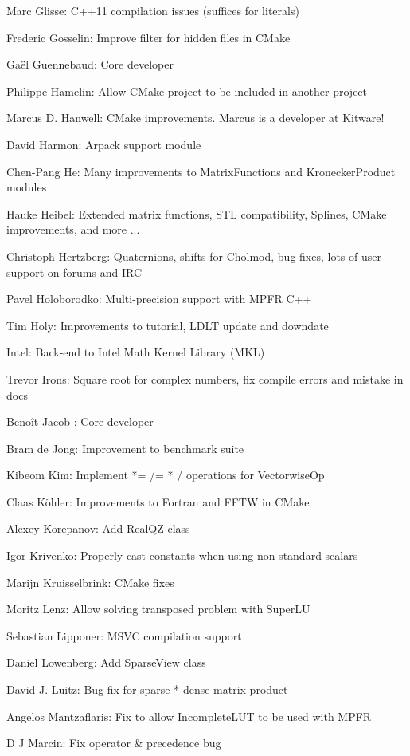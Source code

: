 Marc Glisse:  C++11 compilation issues (suffices for literals)  

Frederic Gosselin:  Improve filter for hidden files in CMake  

Gaël Guennebaud:  Core developer  

Philippe Hamelin:  Allow CMake project to be included in another project  

Marcus D. Hanwell:  CMake improvements. Marcus is a developer at Kitware!  

David Harmon:  Arpack support module  

Chen-Pang He:  Many improvements to MatrixFunctions and KroneckerProduct modules  

Hauke Heibel:  Extended matrix functions, STL compatibility, Splines, CMake improvements, and more ...  

Christoph Hertzberg:  Quaternions, shifts for Cholmod, bug fixes, lots of user support on forums and IRC  

Pavel Holoborodko:  Multi-precision support with MPFR C++  

Tim Holy:  Improvements to tutorial, LDLT update and downdate  

Intel:  Back-end to Intel Math Kernel Library (MKL)  

Trevor Irons:  Square root for complex numbers, fix compile errors and mistake in docs  

Benoît Jacob : Core developer  

Bram de Jong:  Improvement to benchmark suite  

Kibeom Kim:  Implement *= /= * / operations for VectorwiseOp  

Claas Köhler:  Improvements to Fortran and FFTW in CMake  

Alexey Korepanov:  Add RealQZ class  

Igor Krivenko:  Properly cast constants when using non-standard scalars  

Marijn Kruisselbrink:  CMake fixes  

Moritz Lenz:  Allow solving transposed problem with SuperLU  

Sebastian Lipponer:  MSVC compilation support  

Daniel Lowenberg:  Add SparseView class  

David J. Luitz:  Bug fix for sparse * dense matrix product  

Angelos Mantzaflaris:  Fix to allow IncompleteLUT to be used with MPFR  

D J Marcin:  Fix operator \& precedence bug  

